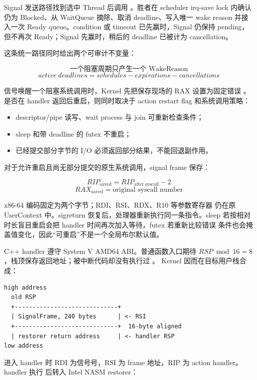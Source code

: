 Signal 发送路径找到选中 Thread 后调用
。胜者在 scheduler irq-save lock
内确认仍为 Blocked、从 WaitQueue 摘除、取消 deadline、写入唯一 wake reason
并接入一次 Ready queue。condition 或 timeout 已先赢时，Signal 仍保持
pending，但不再次 Ready；Signal 先赢时，稍后的 deadline 已被计为 cancellation。

这条统一路径同时给出两个可审计不变量：

\[
  \text{一个阻塞周期只产生一个 WakeReason}
\]
\[
  active\ deadlines=schedules-expirations-cancellations
\]

信号唤醒一个阻塞系统调用时，Kernel 先把保存现场的 RAX 设置为固定错误
。是否在 handler 返回后重启，则同时取决于 action restart flag
和系统调用策略：

\begin{itemize}
  \item descriptor/pipe 读写、wait process 与 join 可重新检查条件；
  \item sleep 和带 deadline 的 futex 不重启；
  \item 已经提交部分字节的 I/O 必须返回部分结果，不能回退副作用。
\end{itemize}

对于允许重启且尚无部分提交的原生系统调用，signal frame 保存：

\[
  RIP_{\mathrm{saved}}=RIP_{\mathrm{after\ syscall}}-2
\]
\[
  RAX_{\mathrm{saved}}=\text{original syscall number}
\]

x86-64  编码固定为两个字节；RDI、RSI、RDX、R10 等参数寄存器
仍在原 UserContext 中。sigreturn 恢复后，处理器重新执行同一条指令。sleep
若按相对时长盲目重启会把 handler 时间再次加入等待，futex 若重新比较错误
条件也会掩盖值变化，因此“可重启”不是一个全局布尔默认值。

C++ handler 遵守 System V AMD64 ABI。普通函数入口期待
\(RSP\bmod16=8\)，栈顶保存返回地址；被中断代码却没有执行过 。
Kernel 因而在目标用户栈合成：

\begin{lstlisting}
high address
  old RSP
  +-----------------------------+
  | SignalFrame, 240 bytes      | <- RSI
  +-----------------------------+  16-byte aligned
  | restorer return address     | <- handler RSP
low address
\end{lstlisting}

进入 handler 时 RDI 为信号号，RSI 为 frame 地址，RIP 为 action handler。
handler 执行  后转入 Intel NASM restorer：

